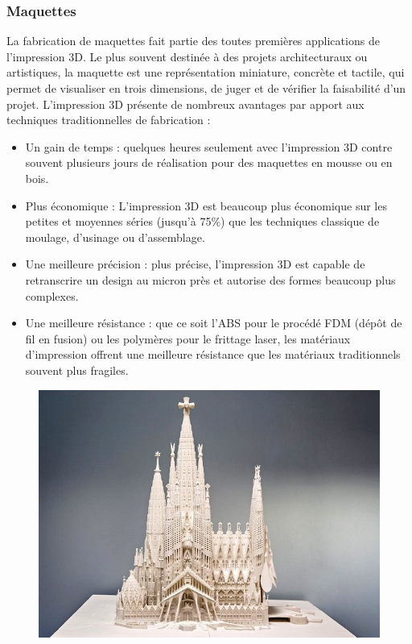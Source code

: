 \documentclass{article}
\begin{document}
\subsubsection{Maquettes}
La fabrication de maquettes fait partie des toutes premières applications de l'impression 3D. Le plus souvent destinée à des projets architecturaux ou artistiques, la maquette est une représentation miniature, concrète et tactile, qui permet de visualiser en trois dimensions, de juger et de vérifier la faisabilité d'un projet. L'impression 3D présente de nombreux avantages par apport aux techniques traditionnelles de fabrication :
\begin{itemize}
\item Un gain de temps : quelques heures seulement avec l'impression 3D contre souvent plusieurs
jours de réalisation pour des maquettes en mousse ou en bois.
\item Plus économique : L'impression 3D est beaucoup plus économique sur les petites et moyennes
séries (jusqu'à 75\%) que les techniques classique de moulage, d'usinage ou d'assemblage.
\item Une meilleure précision : plus précise, l'impression 3D est capable de retranscrire un design au micron près et autorise des formes beaucoup plus complexes.
\item Une meilleure résistance : que ce soit l'ABS pour le procédé FDM (dépôt de fil en fusion) ou les polymères pour le frittage laser, les matériaux d'impression offrent une meilleure résistance que les matériaux traditionnels souvent plus fragiles.
\end{itemize}
\begin{figure}[h!]
\centering
\includegraphics[scale=0.4]{./images/Maquette-imprimee-3D-Sagrada-Familia.png}
\end{figure}
\end{document}

